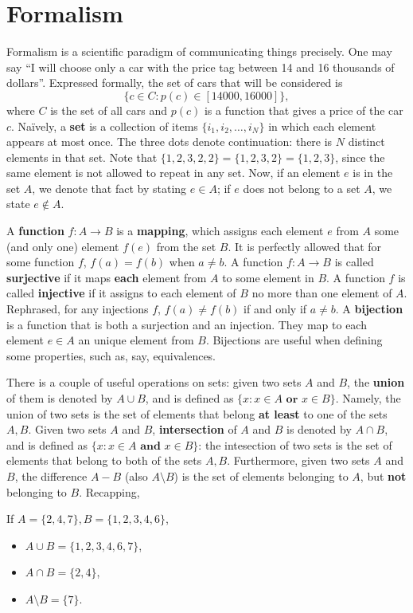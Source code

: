 \section{Formalism}
Formalism is a scientific paradigm of communicating things precisely. One may say ``I will choose only a car with the price tag between 14 and 16 thousands 
of dollars''. Expressed formally, the set of cars that will be considered is \[
\{c \in C \colon p(c) \in [14000, 16000]\},
\]
where $C$ is the set of all cars and $p(c)$ is a function that gives a price of the car $c$. Na\"ively, a \textbf{set} is a collection of items 
$\{ i_1, i_2, \dots, i_N\}$ in which each element appears at most once. The three dots denote continuation: there is $N$ distinct elements in that set. 
Note that $\{1, 2, 3, 2, 2\} = \{1, 2, 3, 2 \} = \{1, 2, 3\}$, since the same element is not allowed to repeat in any set. Now, if an element $e$ is in the set $A$,
we denote that fact by stating $e \in A$; if $e$ does not belong to a set $A$, we state $e \not\in A$.

A \textbf{function} $f \colon A \to B$ is a \textbf{mapping}, which assigns each element $e$ from $A$ some (and only one) element $f(e)$ from the set $B$. It is perfectly allowed that for some function $f$, $f(a) = f(b)$ when $a \neq b$. A function $f \colon A \to B$ is called \textbf{surjective} if it maps \textbf{each} element from $A$ to some element in $B$. A function $f$ is called \textbf{injective} if it assigns to each element of $B$ no more than one element of $A$. Rephrased, for any injections $f$, $f(a) \neq f(b)$ if and only if $a \neq b$. A \textbf{bijection} is a function that is both a surjection and an injection. They map to each element $e \in A$ an unique element from $B$. Bijections are useful when defining some properties, such as, say, equivalences.

There is a couple of useful operations on sets:
given two sets $A$ and $B$, the \textbf{union} of them is denoted by $A \cup B$, and is defined as $\{x \colon x \in A \textbf{ or } x \in B \}$. Namely, the union of two sets is the set of elements that belong \textbf{at least} to one of the sets $A, B$.
Given two sets $A$ and $B$, \textbf{intersection} of $A$ and $B$ is denoted by $A \cap B$, and is defined as $\{ x \colon x \in A \textbf{ and } x \in B\}$: the intesection of two sets is the set of elements that belong to both of the sets $A, B$. Furthermore, given two sets $A$ and $B$, the difference $A - B$ (also $A \setminus B$) is the set of elements belonging to $A$, but \textbf{not} belonging to $B$. Recapping,
\begin{example}
If $A = \{2, 4, 7\}, B = \{ 1, 2, 3, 4, 6 \}$,
\begin{itemize}
  \item $A \cup B = \{ 1, 2, 3, 4, 6, 7 \}$,
  \item $A \cap B = \{ 2, 4 \}$,
  \item $A \setminus B = \{ 7 \}$.
\end{itemize}
\end{example}

